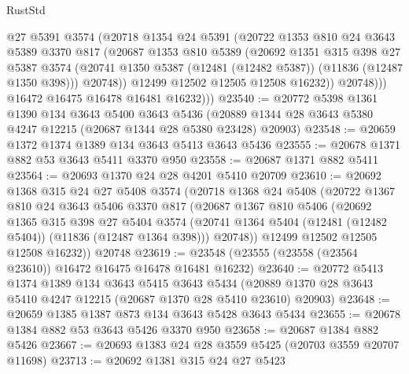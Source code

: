 \begin{lexlean}{RustStd}
\begin{coremodule}
                @27
                @5391
                @3574
                (@20718
                  @1354
                  @24
                  @5391
                  (@20722
                    @1353
                    @810
                    @24
                    @3643
                    @5389
                    @3370
                    @817
                    (@20687
                      @1353
                      @810
                      @5389
                      (@20692
                        @1351
                        @315
                        @398
                        @27
                        @5387
                        @3574
                        (@20741 @1350 @5387 (@12481 (@12482 @5387)) (@11836 (@12487 @1350 @398)))
                        @20748))
                    @12499
                    @12502
                    @12505
                    @12508
                    @16232))
                @20748)))
          @16472
          @16475
          @16478
          @16481
          @16232)))
@23540 := @20772
    @5398
    @1361
    @1390
    @134
    @3643
    @5400
    @3643
    @5436
    (@20889 @1344 @28 @3643 @5380 @4247 @12215 (@20687 @1344 @28 @5380 @23428) @20903)
@23548 := @20659 @1372 @1374 @1389 @134 @3643 @5413 @3643 @5436
@23555 := @20678 @1371 @882 @53 @3643 @5411 @3370 @950
@23558 := @20687 @1371 @882 @5411
@23564 := @20693 @1370 @24 @28 @4201 @5410 @20709
@23610 := @20692
    @1368
    @315
    @24
    @27
    @5408
    @3574
    (@20718
      @1368
      @24
      @5408
      (@20722
        @1367
        @810
        @24
        @3643
        @5406
        @3370
        @817
        (@20687
          @1367
          @810
          @5406
          (@20692
            @1365
            @315
            @398
            @27
            @5404
            @3574
            (@20741 @1364 @5404 (@12481 (@12482 @5404)) (@11836 (@12487 @1364 @398)))
            @20748))
        @12499
        @12502
        @12505
        @12508
        @16232))
    @20748
@23619 := @23548 (@23555 (@23558 (@23564 @23610)) @16472 @16475 @16478 @16481 @16232)
@23640 := @20772
    @5413
    @1374
    @1389
    @134
    @3643
    @5415
    @3643
    @5434
    (@20889 @1370 @28 @3643 @5410 @4247 @12215 (@20687 @1370 @28 @5410 @23610) @20903)
@23648 := @20659 @1385 @1387 @873 @134 @3643 @5428 @3643 @5434
@23655 := @20678 @1384 @882 @53 @3643 @5426 @3370 @950
@23658 := @20687 @1384 @882 @5426
@23667 := @20693 @1383 @24 @28 @3559 @5425 (@20703 @3559 @20707 @11698)
@23713 := @20692
    @1381
    @315
    @24
    @27
    @5423

\end{coremodule}
\end{lexlean}
